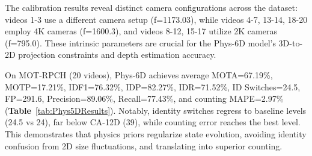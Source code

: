 The calibration results reveal distinct camera configurations across the dataset: videos 1-3 use a different camera setup (f=1173.03), while videos 4-7, 13-14, 18-20 employ 4K cameras (f=1600.3), and videos 8-12, 15-17 utilize 2K cameras (f=795.0). These intrinsic parameters are crucial for the Phys-6D model's 3D-to-2D projection constraints and depth estimation accuracy.

On MOT-RPCH (20 videos), Phys-6D achieves average MOTA=67.19\%, MOTP=17.21\%, IDF1=76.32\%, IDP=82.27\%, IDR=71.52\%, ID Switches=24.5, FP=291.6, Precision=89.06\%, Recall=77.43\%, and counting MAPE=2.97\% (\textbf{Table}~\ref{tab:Phys5DResults}). Notably, identity switches regress to baseline levels (24.5 vs 24), far below CA-12D (39), while counting error reaches the best level. This demonstrates that physics priors regularize state evolution, avoiding identity confusion from 2D size fluctuations, and translating into superior counting.
